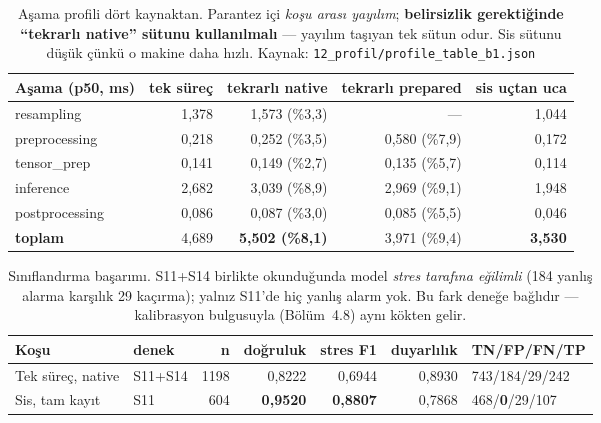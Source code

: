 \documentclass[11pt,a4paper]{article}
\newcommand{\dosya}[1]{\texttt{\footnotesize #1}}
\begin{document}
\begin{table}[H]
\centering\small
\begin{tabular}{@{}lrrrr@{}}
\toprule
\textbf{Aşama (p50, ms)} & \textbf{tek süreç} & \textbf{tekrarlı native} & \textbf{tekrarlı prepared} & \textbf{sis uçtan uca} \\
\midrule
resampling      & 1{,}378 & 1{,}573 (\%3{,}3) & ---              & 1{,}044 \\
preprocessing   & 0{,}218 & 0{,}252 (\%3{,}5) & 0{,}580 (\%7{,}9) & 0{,}172 \\
tensor\_prep    & 0{,}141 & 0{,}149 (\%2{,}7) & 0{,}135 (\%5{,}7) & 0{,}114 \\
inference       & 2{,}682 & 3{,}039 (\%8{,}9) & 2{,}969 (\%9{,}1) & 1{,}948 \\
postprocessing  & 0{,}086 & 0{,}087 (\%3{,}0) & 0{,}085 (\%5{,}5) & 0{,}046 \\
\midrule
\textbf{toplam} & 4{,}689 & \textbf{5{,}502 (\%8{,}1)} & 3{,}971 (\%9{,}4) & \textbf{3{,}530} \\
\bottomrule
\end{tabular}
\caption{Aşama profili dört kaynaktan. Parantez içi \emph{koşu arası yayılım};
\textbf{belirsizlik gerektiğinde ``tekrarlı native'' sütunu kullanılmalı} ---
yayılım taşıyan tek sütun odur. Sis sütunu düşük çünkü o makine daha hızlı.
Kaynak: \dosya{12\_profil/profile\_table\_b1.json}}
\end{table}

\begin{table}[H]
\centering\small
\begin{tabular}{@{}llrrrrl@{}}
\toprule
\textbf{Koşu} & \textbf{denek} & \textbf{n} & \textbf{doğruluk} & \textbf{stres F1} & \textbf{duyarlılık} & \textbf{TN/FP/FN/TP} \\
\midrule
Tek süreç, native & S11+S14 & 1198 & 0{,}8222 & 0{,}6944 & 0{,}8930 & 743/184/29/242 \\
Sis, tam kayıt    & S11     & 604  & \textbf{0{,}9520} & \textbf{0{,}8807} & 0{,}7868 & 468/\textbf{0}/29/107 \\
\bottomrule
\end{tabular}
\caption{Sınıflandırma başarımı. S11+S14 birlikte okunduğunda model
\emph{stres tarafına eğilimli} (184 yanlış alarma karşılık 29 kaçırma);
yalnız S11'de hiç yanlış alarm yok. Bu fark deneğe bağlıdır --- kalibrasyon
bulgusuyla (Bölüm~4.8) aynı kökten gelir.}
\end{table}
\end{document}
